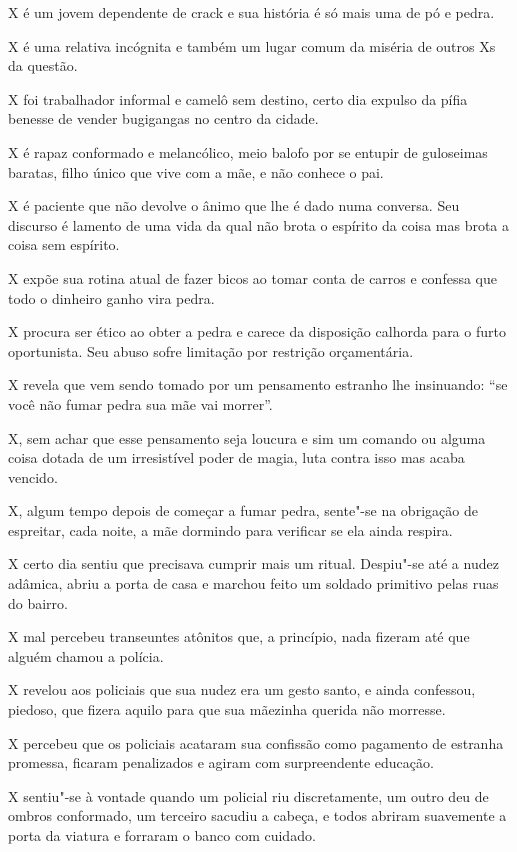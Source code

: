  

X é um jovem dependente de crack e sua história é só mais uma de pó e
pedra.

X é uma relativa incógnita e também um lugar comum da miséria de outros
Xs da questão.

X foi trabalhador informal e camelô sem destino, certo dia expulso da
pífia benesse de vender bugigangas no centro da cidade.

X é rapaz conformado e melancólico, meio balofo por se entupir de
guloseimas baratas, filho único que vive com a mãe, e não conhece o pai.

X é paciente que não devolve o ânimo que lhe é dado numa conversa. Seu
discurso é lamento de uma vida da qual não brota o espírito da coisa mas
brota a coisa sem espírito.

X expõe sua rotina atual de fazer bicos ao tomar conta de carros e
confessa que todo o dinheiro ganho vira pedra.

X procura ser ético ao obter a pedra e carece da disposição calhorda
para o furto oportunista. Seu abuso sofre limitação por restrição
orçamentária.

X revela que vem sendo tomado por um pensamento estranho lhe insinuando:
``se você não fumar pedra sua mãe vai morrer''.

X, sem achar que esse pensamento seja loucura e sim um comando ou alguma
coisa dotada de um irresistível poder de magia, luta contra isso mas
acaba vencido.

X, algum tempo depois de começar a fumar pedra, sente"-se na obrigação de
espreitar, cada noite, a mãe dormindo para verificar se ela ainda
respira.

X certo dia sentiu que precisava cumprir mais um ritual. Despiu"-se até a
nudez adâmica, abriu a porta de casa e marchou feito um soldado
primitivo pelas ruas do bairro.

X mal percebeu transeuntes atônitos que, a princípio, nada fizeram até
que alguém chamou a polícia.

X revelou aos policiais que sua nudez era um gesto santo, e ainda
confessou, piedoso, que fizera aquilo para que sua mãezinha querida não
morresse.

X percebeu que os policiais acataram sua confissão como pagamento de
estranha promessa, ficaram penalizados e agiram com surpreendente
educação.

X sentiu"-se à vontade quando um policial riu discretamente, um outro deu
de ombros conformado, um terceiro sacudiu a cabeça, e todos abriram
suavemente a porta da viatura e forraram o banco com cuidado.

